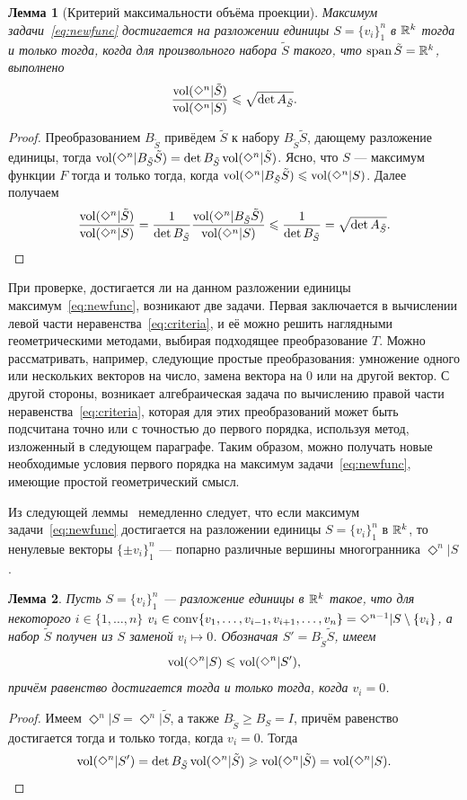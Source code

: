 \documentclass[a4paper,12pt]{article}
\def\vol{\mathop{\rm vol}}
\def\co{\mathop{\rm conv}}
\def\span{\mathop{\rm span}}
\newcommand{\crosp}{\Diamond}
\newtheorem{lem}{Лемма}[section]
\numberwithin{equation}{section}
\begin{document}
	\begin{lem}[Критерий максимальности объёма проекции]\label{lem:criteria}
		Максимум задачи~\eqref{eq:newfunc} достигается на разложении единицы $S=\{v_i\}_1^n$ в $\mathbb {R}^k$ тогда и только тогда, когда для произвольного набора $\tilde{S}$ такого, что $\span\tilde{S}=\RR^k$, выполнено
			\begin{equation}\label{eq:criteria}
				\frac{\vol(\crosp^n|\tilde{S})}{\vol(\crosp^n|S)}\leqslant\sqrt{\det A_{\tilde{S}}}.
			\end{equation}
	\end{lem}
	\begin{proof}
		Преобразованием $B_{\tilde{S}}$ привёдем $\tilde{S}$ к набору $B_{\tilde{S}}\tilde{S}$, дающему разложение единицы, тогда $\vol(\crosp^n|B_{\tilde{S}}\tilde{S})=\det B_{\tilde{S}}\vol(\crosp^n|\tilde{S})$. Ясно, что $S$ --- максимум функции $F$ тогда и только тогда, когда $\vol(\crosp^n|B_{\tilde{S}}\tilde{S})\leqslant\vol(\crosp^n|S)$. Далее получаем
			$$\frac{\vol(\crosp^n|\tilde{S})}{\vol(\crosp^n|S)}=\frac{1}{\det B_{\tilde{S}}}\frac{\vol(\crosp^n|B_{\tilde{S}}\tilde{S})}{\vol(\crosp^n|S)}\leqslant\frac{1}{\det B_{\tilde{S}}}=\sqrt{\det A_{\tilde{S}}}.$$
	\end{proof}
	При проверке, достигается ли на данном разложении единицы максимум~\eqref{eq:newfunc}, возникают две задачи. Первая заключается в вычислении левой части неравенства~\eqref{eq:criteria}, и её можно решить наглядными геометрическими методами, выбирая подходящее преобразование $T$. Можно рассматривать, например, следующие простые преобразования: умножение одного или нескольких векторов на число, замена вектора на 0 или на другой вектор. С другой стороны, возникает алгебраическая задача по вычислению правой части неравенства~\eqref{eq:criteria}, которая для этих преобразований может быть подсчитана точно или с точностью до первого порядка, используя метод, изложенный в следующем параграфе. Таким образом, можно получать новые необходимые условия первого порядка на максимум задачи~\eqref{eq:newfunc}, имеющие простой геометрический смысл.

	Из следующей леммы~\cite{crospol} немедленно следует, что если максимум задачи~\eqref{eq:newfunc} достигается на разложении единицы $S=\{v_i\}_1^n$ в $\mathbb {R}^k$, то ненулевые векторы $\{\pm v_i\}_1^n$ --- попарно различные вершины многогранника $\crosp^n|S$.
	\begin{lem}\label{lem:33}
		Пусть $S=\{v_i\}_1^n$ --- разложение единицы в $\mathbb {R}^k$ такое, что для некоторого $i\in\{1,\ldots,n\}$ $v_i\in\co\{v_1,\ldots,v_{i-1},v_{i+1},\ldots,v_n\}=\crosp^{n-1}|S\setminus\{v_i\}$, а набор $\tilde{S}$ получен из $S$ заменой $v_i\mapsto 0$. Обозначая $S'=B_{\tilde{S}}\tilde{S}$, имеем
			$$\vol(\crosp^n|S)\leqslant\vol(\crosp^n|S'),$$
		причём равенство достигается тогда и только тогда, когда $v_i=0$.
	\end{lem}
	\begin{proof}
		Имеем $\crosp^n|S=\crosp^n|\tilde{S}$, а также $B_{\tilde{S}}\geqslant B_S=I$, причём равенство достигается тогда и только тогда, когда $v_i=0$. Тогда
			$$\vol(\crosp^n|S')=\det B_{\tilde{S}}\vol(\crosp^n|\tilde{S})\geqslant\vol(\crosp^n|\tilde{S})=\vol(\crosp^n|S).$$
	\end{proof}
\end{document}
